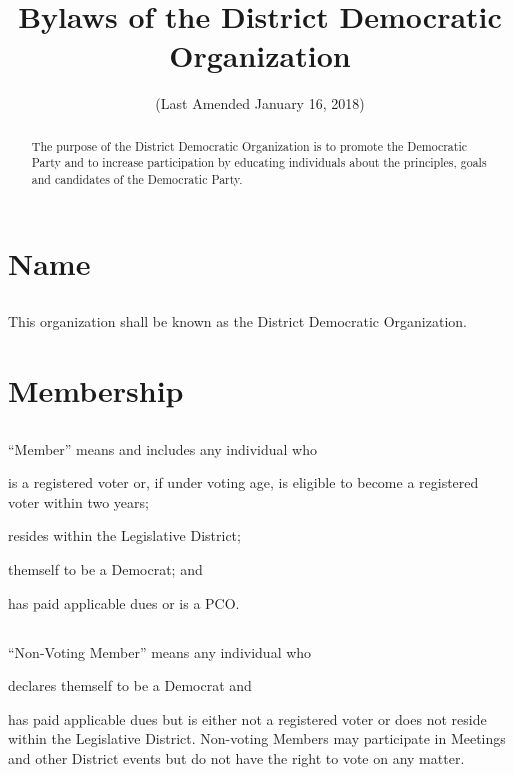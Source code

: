 \documentclass{article}
\newcommand{\fortythird}{\nth{43}}
\newcommand{\district}{\fortythird{} District}
\newcommand{\thedistrict}{the \district{}}
\newcommand{\theLD}{the \fortythird{} Legislative District}
\begin{document}
\title{Bylaws of \thedistrict{} Democratic Organization}
\date{(Last Amended January 16, 2018)}
\maketitle

\renewcommand{\abstractname}{Preamble}
\begin{abstract}
The purpose of \thedistrict{} Democratic Organization is to promote the Democratic Party and to increase participation by educating individuals about the principles, goals and candidates of the Democratic Party.
\end{abstract}

\section{Name}
\subsection{}
This organization shall be known as \thedistrict{} Democratic Organization.

\section{Membership}
\subsection{}
“Member” means and includes any individual who
\begin{inlinealphalist}
    \item is a registered voter or, if under voting age, is eligible to become a registered voter within two years;
    \item resides within \theLD{};
    \item themself to be a Democrat; and
    \item has paid applicable dues or is a PCO.
\end{inlinealphalist}

\subsection{}
“Non-Voting Member” means any individual who
\begin{inlinealphalist}
    \item declares themself to be a Democrat and
    \item has paid applicable dues but is either not a registered voter or does not reside within \theLD{}. Non-voting Members may participate in Meetings and other \district{} events but do not have the right to vote on any matter.
\end{inlinealphalist}
\end{document}

